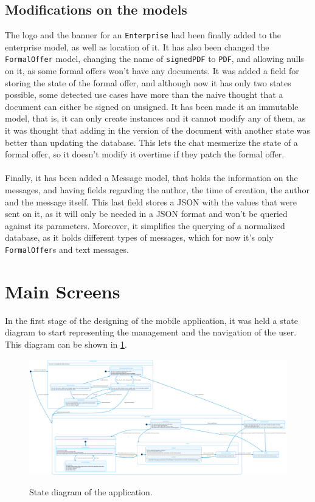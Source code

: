 \documentclass[./main.tex]{subfiles}
\begin{document}
\subsection{Modifications on the models}
The logo and the banner for an \texttt{Enterprise} had been finally added to the enterprise model, as well as  location of it. It has also been changed the \texttt{FormalOffer} model, changing the name of \texttt{signedPDF} to \texttt{PDF}, and allowing nulls on it, as some formal offers won't have any documents. It was added a field for storing the state of the formal offer, and although now it has only two states possible, some detected use cases have more than the naive thought that a document can either be signed on unsigned. It has been made it an immutable model, that is, it can only create instances and it cannot modify any of them, as it was thought that adding in the version of the document with another state was better than updating the database. This lets the chat mesmerize the state of a formal offer, so it doesn't modify it overtime if they patch the formal offer.\\
\\
Finally, it has been added a Message model, that holds the information on the messages, and having fields regarding the author, the time of creation, the author and the message itself. This last field stores a JSON with the values that were sent on it, as it will only be needed in a JSON format and won't be queried against its parameters. Moreover, it simplifies the querying of a normalized database, as it holds different types of messages, which for now it's only \texttt{FormalOffer}s and text messages.
\section{Main Screens} \label{sec:views}
In the first stage of the designing of the mobile application, it was held a state diagram to start representing the management and the navigation of the user. This diagram can be shown in \ref{fig:stateapp}.
\begin{figure}
	\centering
	\includegraphics[width=14cm]{stateapp.png}
	\label{fig:stateapp}
	\caption{State diagram of the application.}
\end{figure}
\end{document}
